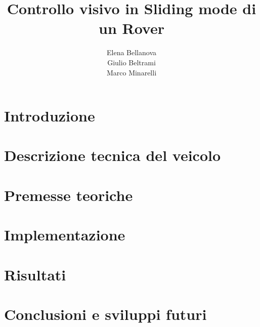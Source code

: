 \documentclass{article}
\title{Controllo visivo in Sliding mode di un Rover}
\author{Elena Bellanova \\ Giulio Beltrami \\ Marco Minarelli}
\date{}
\begin{document}


\tableofcontents

\clearpage
\section{Introduzione}


\section{Descrizione tecnica del veicolo} 


\section{Premesse teoriche}


\section{Implementazione}


\section{Risultati}


\section{Conclusioni e sviluppi futuri}

\end{document}
